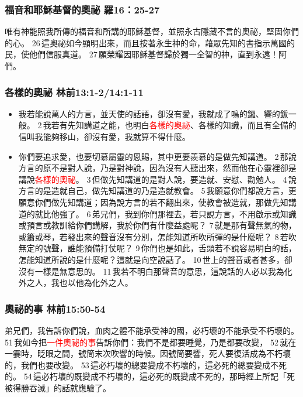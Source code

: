 \subsubsection{福音和耶穌基督的奧祕 羅16：25-27}
唯有神能照我所傳的福音和所講的耶穌基督，並照永古隱藏不言的奧祕，堅固你們的心。 26 這奧祕如今顯明出來，而且按著永生神的命，藉眾先知的書指示萬國的民，使他們信服真道。 27 願榮耀因耶穌基督歸於獨一全智的神，直到永遠！阿們。

\subsubsection{各樣的奧祕 林前13:1-2/14:1-11}
\begin{itemize}
\item 我若能說萬人的方言，並天使的話語，卻沒有愛，我就成了鳴的鑼、響的鈸一般。 2 我若有先知講道之能，也明白\textcolor{red}{各樣的奧祕}、各樣的知識，而且有全備的信叫我能夠移山，卻沒有愛，我就算不得什麼。
\item 你們要追求愛，也要切慕屬靈的恩賜，其中更要羨慕的是做先知講道。 2 那說方言的原不是對人說，乃是對神說，因為沒有人聽出來，然而他在心靈裡卻是講說\textcolor{red}{各樣的奧祕}。 3 但做先知講道的是對人說，要造就、安慰、勸勉人。 4 說方言的是造就自己，做先知講道的乃是造就教會。 5 我願意你們都說方言，更願意你們做先知講道；因為說方言的若不翻出來，使教會被造就，那做先知講道的就比他強了。 6 弟兄們，我到你們那裡去，若只說方言，不用啟示或知識或預言或教訓給你們講解，我於你們有什麼益處呢？ 7 就是那有聲無氣的物，或簫或琴，若發出來的聲音沒有分別，怎能知道所吹所彈的是什麼呢？ 8 若吹無定的號聲，誰能預備打仗呢？ 9 你們也是如此，舌頭若不說容易明白的話，怎能知道所說的是什麼呢？這就是向空說話了。 10 世上的聲音或者甚多，卻沒有一樣是無意思的。 11 我若不明白那聲音的意思，這說話的人必以我為化外之人，我也以他為化外之人。
\end{itemize}

\subsubsection{奧祕的事 林前15:50-54}
弟兄們，我告訴你們說，血肉之體不能承受神的國，必朽壞的不能承受不朽壞的。 51 我如今把\textcolor{red}{一件奧祕的事}告訴你們：我們不是都要睡覺，乃是都要改變， 52 就在一霎時，眨眼之間，號筒末次吹響的時候。因號筒要響，死人要復活成為不朽壞的，我們也要改變。 53 這必朽壞的總要變成不朽壞的，這必死的總要變成不死的。 54 這必朽壞的既變成不朽壞的，這必死的既變成不死的，那時經上所記「死被得勝吞滅」的話就應驗了。

